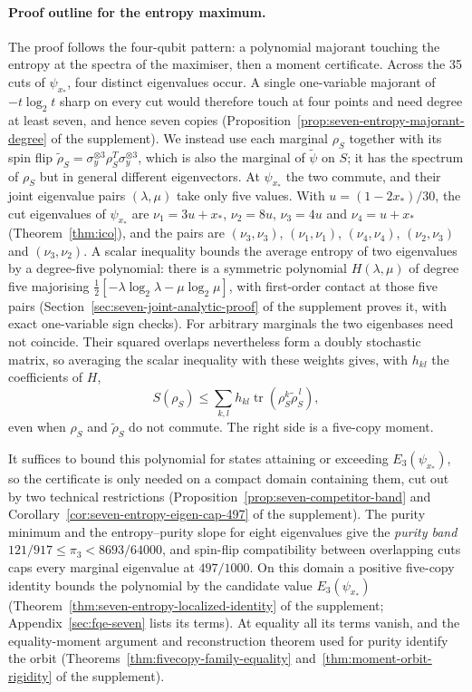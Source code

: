 \paragraph{Proof outline for the entropy maximum.} The proof follows the four-qubit pattern: a polynomial majorant
touching the entropy at the spectra of the maximiser, then a moment certificate. Across the 35 cuts of $\psi_{x_*}$, four
distinct eigenvalues occur. A single one-variable majorant of $-t\log_2t$ sharp on every cut would therefore touch at
four points and need degree at least seven, and hence seven copies (Proposition~\ref{prop:seven-entropy-majorant-degree}
of the supplement). We instead use each marginal $\rho_S$ together
with its spin flip $\widetilde\rho_S=\sigma_y^{\otimes3}\rho_S^T\sigma_y^{\otimes3}$, which is also the marginal of
$\tilde\psi$ on $S$; it has the spectrum of $\rho_S$ but in general different eigenvectors. At $\psi_{x_*}$ the two commute,
and their joint eigenvalue pairs $(\lambda,\mu)$ take only five values. With $u=(1-2x_*)/30$, the cut
eigenvalues of $\psi_{x_*}$ are $\nu_1=3u+x_*$, $\nu_2=8u$, $\nu_3=4u$ and $\nu_4=u+x_*$ (Theorem~\ref{thm:ico}), and the
pairs are $(\nu_3,\nu_3)$, $(\nu_1,\nu_1)$, $(\nu_4,\nu_4)$, $(\nu_2,\nu_3)$ and $(\nu_3,\nu_2)$.
A scalar inequality bounds the average entropy of two eigenvalues by a degree-five polynomial: there is a symmetric
polynomial $H(\lambda,\mu)$ of degree five majorising $\tfrac12[-\lambda\log_2\lambda-\mu\log_2\mu]$, with first-order
contact at those five pairs (Section~\ref{sec:seven-joint-analytic-proof} of the supplement proves it, with exact
one-variable sign checks). For arbitrary marginals the two eigenbases need not coincide. Their squared overlaps
nevertheless form a doubly stochastic matrix, so averaging the scalar inequality with these weights gives, with
$h_{kl}$ the coefficients of $H$,
\[
S(\rho_S)\le
\sum_{k,l}h_{kl}\operatorname{tr}(\rho_S^k\widetilde\rho_S^{\,l}),
\]
even when $\rho_S$ and $\widetilde\rho_S$ do not commute. The right side is a five-copy moment.

It suffices to bound this polynomial for states attaining or exceeding $E_3(\psi_{x_*})$, so the certificate is only
needed on a compact domain containing them, cut out by two technical restrictions (Proposition~\ref{prop:seven-competitor-band}
and Corollary~\ref{cor:seven-entropy-eigen-cap-497} of the supplement). The purity minimum and the entropy--purity slope
for eight eigenvalues give the \emph{purity band} $121/917\le\pi_3<8693/64000$, and
spin-flip compatibility between overlapping cuts caps every marginal eigenvalue at $497/1000$. On this
domain a positive five-copy identity bounds the polynomial by the candidate value $E_3(\psi_{x_*})$
(Theorem~\ref{thm:seven-entropy-localized-identity} of the supplement; Appendix~\ref{sec:fqe-seven} lists its terms).
At equality all its terms vanish, and the equality-moment argument and reconstruction
theorem used for purity identify the orbit (Theorems~\ref{thm:fivecopy-family-equality} and~\ref{thm:moment-orbit-rigidity} of the
supplement).

